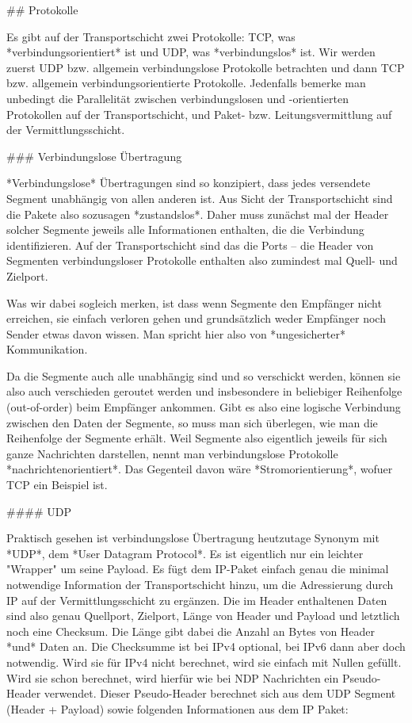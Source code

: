 ## Protokolle

Es gibt auf der Transportschicht zwei Protokolle: TCP, was
*verbindungsorientiert* ist und UDP, was *verbindungslos* ist. Wir werden zuerst
UDP bzw. allgemein verbindungslose Protokolle betrachten und dann TCP
bzw. allgemein verbindungsorientierte Protokolle. Jedenfalls bemerke man
unbedingt die Parallelität zwischen verbindungslosen und -orientierten
Protokollen auf der Transportschicht, und Paket- bzw. Leitungsvermittlung auf
der Vermittlungsschicht.

### Verbindungslose Übertragung

*Verbindungslose* Übertragungen sind so konzipiert, dass jedes versendete
Segment unabhängig von allen anderen ist. Aus Sicht der Transportschicht sind
die Pakete also sozusagen *zustandslos*. Daher muss zunächst mal der Header
solcher Segmente jeweils alle Informationen enthalten, die die Verbindung
identifizieren. Auf der Transportschicht sind das die Ports -- die Header von
Segmenten verbindungsloser Protokolle enthalten also zumindest mal Quell- und
Zielport.

Was wir dabei sogleich merken, ist dass wenn Segmente den Empfänger nicht
erreichen, sie einfach verloren gehen und grundsätzlich weder Empfänger noch
Sender etwas davon wissen. Man spricht hier also von *ungesicherter*
Kommunikation.

Da die Segmente auch alle unabhängig sind und so verschickt werden, können sie
also auch verschieden geroutet werden und insbesondere in beliebiger Reihenfolge
(out-of-order) beim Empfänger ankommen. Gibt es also eine logische Verbindung
zwischen den Daten der Segmente, so muss man sich überlegen, wie man die
Reihenfolge der Segmente erhält. Weil Segmente also eigentlich jeweils für sich
ganze Nachrichten darstellen, nennt man verbindungslose Protokolle
*nachrichtenorientiert*. Das Gegenteil davon wäre *Stromorientierung*, wofuer
TCP ein Beispiel ist.

#### UDP

Praktisch gesehen ist verbindungslose Übertragung heutzutage Synonym mit *UDP*,
dem *User Datagram Protocol*. Es ist eigentlich nur ein leichter "Wrapper" um
seine Payload. Es fügt dem IP-Paket einfach genau die minimal notwendige
Information der Transportschicht hinzu, um die Adressierung durch IP auf der
Vermittlungsschicht zu ergänzen. Die im Header enthaltenen Daten sind also genau
Quellport, Zielport, Länge von Header und Payload und letztlich noch eine
Checksum. Die Länge gibt dabei die Anzahl an Bytes von Header *und* Daten
an. Die Checksumme ist bei IPv4 optional, bei IPv6 dann aber doch
notwendig. Wird sie für IPv4 nicht berechnet, wird sie einfach mit Nullen
gefüllt. Wird sie schon berechnet, wird hierfür wie bei NDP Nachrichten ein
Pseudo-Header verwendet. Dieser Pseudo-Header berechnet sich aus dem UDP Segment
(Header + Payload) sowie folgenden Informationen aus dem IP Paket:

